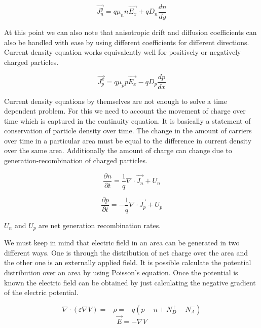 \begin{equation}
\vec{J_n^y}=q \mu_{n} n \vec{E_x}+qD_{n} \frac{dn}{dy} 
\end{equation}

At this point we can also note that anisotropic drift and diffusion coefficients can also be handled with ease by using different coefficients for different directions. Current density equation works equivalently well for positively or negatively charged particles.

\begin{equation}
\vec{J_p^x}=q \mu_{p} p \vec{E_x}-qD_{p} \frac{dp}{dx} 
\label{cdenp}
\end{equation}

Current density equations by themselves are not enough to solve a time dependent problem. For this we need to account the movement of charge over time which is captured in the continuity equation. It is basically a statement of conservation of particle density over time. The change in the amount of carriers over time in a particular area must be equal to the difference in current density over the same area. Additionally the amount of charge can change due to generation-recombination of charged particles.


\begin{equation}
\frac{\partial n}{\partial t}=\frac{1}{q}\nabla \cdot \vec{J_n}+U_{n}
\label{conn}
\end{equation}

\begin{equation}
\frac{\partial p}{\partial t}=-\frac{1}{q}\nabla \cdot \vec{J_p}+U_{p}
\label{conp}
\end{equation}

$U_{n}$ and $U_{p}$ are net generation recombination rates. 

We must keep in mind that electric field in an area can be generated in two different ways. One is through the distribution of net charge over the area and the other one is an externally applied field. It is possible calculate the potential distribution over an area by using Poisson's equation. Once the potential is known the electric field can be obtained by just calculating the negative gradient of the electric potential.

\begin{equation}
\nabla \cdot  (\varepsilon \nabla V)=-\rho=-q(p-n+N_{D}^{+}-N_{A}^{-})
\label{poisson}
\end{equation}
\begin{equation}
\vec{E}=-\nabla V
\label{Efield}
\end{equation}

